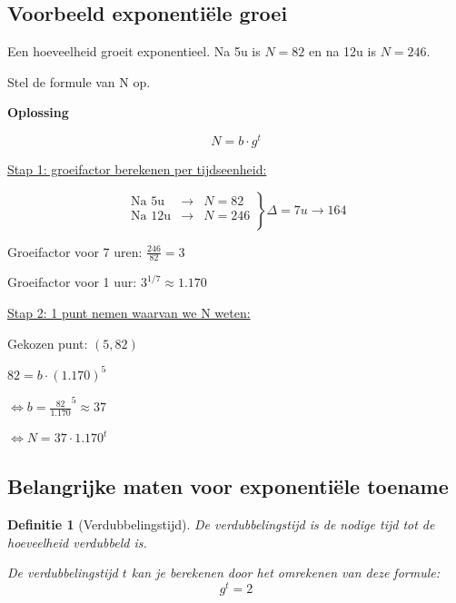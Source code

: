 \documentclass{article}
\newtheorem{theorem}{Definitie}[section]
\begin{document}
\subsection{Voorbeeld exponentiële groei}

Een hoeveelheid groeit exponentieel. Na 5u is $N = 82$ en na 12u is $N = 246$.

Stel de formule van N op.

\textbf{Oplossing}

\begin{equation*}
N = b \cdot g^t
\end{equation*}

\underline{Stap 1: groeifactor berekenen per tijdseenheid:}

\begin{center}
$$
\left.
    \begin{array}{lll}
        \text{Na 5u}  & \rightarrow & N = 82 \\
        \text{Na 12u} & \rightarrow & N = 246 \\
    \end{array}
\right \} \Delta = 7u \rightarrow 164
$$


Groeifactor voor 7 uren: $\frac{246}{82} = 3$

Groeifactor voor 1 uur: $3^{1/7} \approx 1.170$
\end{center}

\underline{Stap 2: 1 punt nemen waarvan we N weten:}

\begin{center}

Gekozen punt: $(5, 82)$

$82 = b \cdot (1.170)^5$

$\Leftrightarrow b = \frac{82}{1.170}^5 \approx 37$

$\Leftrightarrow N = 37 \cdot 1.170^t$
\end{center}

\subsection{Belangrijke maten voor exponentiële toename}


\begin{theorem}[Verdubbelingstijd]
De verdubbelingstijd is de nodige tijd tot de hoeveelheid verdubbeld is.

De verdubbelingstijd $t$ kan je berekenen door het omrekenen van deze formule:
\begin{equation}
g^t = 2
\end{equation}
\end{theorem}
\end{document}
